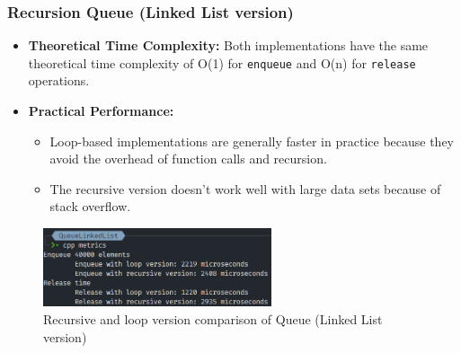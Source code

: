\subsubsection*{Recursion Queue (Linked List version)}
\begin{itemize}
	\item \textbf{Theoretical Time Complexity:} Both implementations have the same theoretical time complexity of O(1) for \verb|enqueue| and O(n) for  \verb|release| operations.
	\item \textbf{Practical Performance:}
	      \begin{itemize}
		      \item  Loop-based implementations are generally faster in practice because they avoid the overhead of function calls and recursion.
		      \item The recursive version doesn't work well with large data sets because of stack overflow.
	      \end{itemize}
\end{itemize}
\begin{figure}[!ht]
	\centering
	\includegraphics[width=0.6\textwidth]{imgs/QueueLinkedList/metrics.png}
	\caption{Recursive and loop version comparison of Queue (Linked List version)}\label{fig:queue_ll_metrics}
\end{figure}